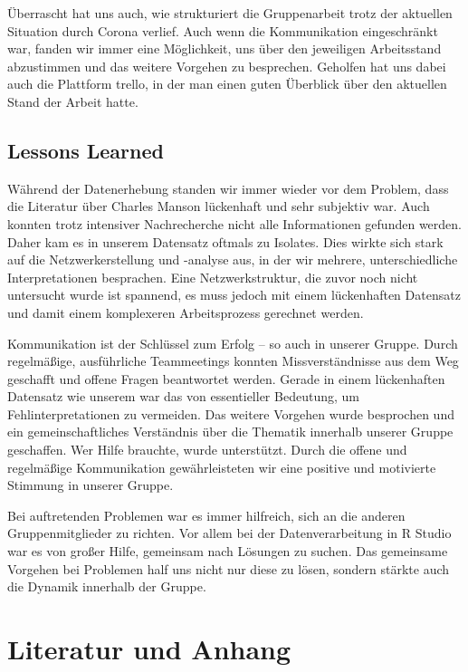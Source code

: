 \documentclass[
]{article}
\begin{document}
Überrascht hat uns auch, wie strukturiert die Gruppenarbeit trotz der
aktuellen Situation durch Corona verlief. Auch wenn die Kommunikation
eingeschränkt war, fanden wir immer eine Möglichkeit, uns über den
jeweiligen Arbeitsstand abzustimmen und das weitere Vorgehen zu
besprechen. Geholfen hat uns dabei auch die Plattform trello, in der man
einen guten Überblick über den aktuellen Stand der Arbeit hatte.

\hypertarget{lessons-learned}{%
\subsection{Lessons Learned}\label{lessons-learned}}

Während der Datenerhebung standen wir immer wieder vor dem Problem, dass
die Literatur über Charles Manson lückenhaft und sehr subjektiv war.
Auch konnten trotz intensiver Nachrecherche nicht alle Informationen
gefunden werden. Daher kam es in unserem Datensatz oftmals zu Isolates.
Dies wirkte sich stark auf die Netzwerkerstellung und -analyse aus, in
der wir mehrere, unterschiedliche Interpretationen besprachen. Eine
Netzwerkstruktur, die zuvor noch nicht untersucht wurde ist spannend, es
muss jedoch mit einem lückenhaften Datensatz und damit einem komplexeren
Arbeitsprozess gerechnet werden.

Kommunikation ist der Schlüssel zum Erfolg -- so auch in unserer Gruppe.
Durch regelmäßige, ausführliche Teammeetings konnten Missverständnisse
aus dem Weg geschafft und offene Fragen beantwortet werden. Gerade in
einem lückenhaften Datensatz wie unserem war das von essentieller
Bedeutung, um Fehlinterpretationen zu vermeiden. Das weitere Vorgehen
wurde besprochen und ein gemeinschaftliches Verständnis über die
Thematik innerhalb unserer Gruppe geschaffen. Wer Hilfe brauchte, wurde
unterstützt. Durch die offene und regelmäßige Kommunikation
gewährleisteten wir eine positive und motivierte Stimmung in unserer
Gruppe.

Bei auftretenden Problemen war es immer hilfreich, sich an die anderen
Gruppenmitglieder zu richten. Vor allem bei der Datenverarbeitung in R
Studio war es von großer Hilfe, gemeinsam nach Lösungen zu suchen. Das
gemeinsame Vorgehen bei Problemen half uns nicht nur diese zu lösen,
sondern stärkte auch die Dynamik innerhalb der Gruppe.

\hypertarget{literatur-und-anhang}{%
\section{Literatur und Anhang}\label{literatur-und-anhang}}
\end{document}
